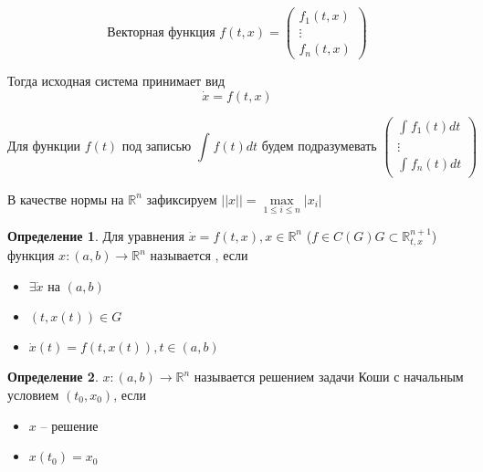 \documentclass[a4paper]{article}
\theoremstyle{indented}
\theoremstyle{definition}
\newtheorem*{defn}{Определение}
\theoremstyle{remark}
\begin{document}
\begin{equation*}
  \text{Векторная функция } f(t,x) = 
  \begin{pmatrix}
    f_1(t,x) \\
    \vdots \\
    f_n(t,x) 
  \end{pmatrix}
\end{equation*}



Тогда исходная система принимает вид
\[\dot x = f(t,x)\]

\[ \text{Для функции $f(t)$ под записью } \int_{}^{}f(t) dt \text{ будем подразумевать }
  \begin{pmatrix}
    \int_{}^{}f_1(t)dt \\
    \vdots \\
    \int_{}^{}f_n(t) dt
  \end{pmatrix}\]


В качестве нормы на $\mathbb{R}^n$ зафиксируем $||x|| = \max\limits_{1 \leqslant i \leqslant n}^{}|x_i|$

\begin{defn}
  Для уравнения $\dot x = f(t,x), x \in \mathbb{R}^n$ ($f \in C(G) G \subset \mathbb{R}^{n+1}_{t,x}$) функция $x : (a,b) \to \mathbb{R}^n$ называется , если
  \begin{itemize}
  \item $\exists \dot x $ на $(a,b)$
  \item $(t,x(t)) \in G$
  \item $\dot x(t) = f(t,x(t)), t \in (a,b)$
  \end{itemize}
\end{defn}

\begin{defn}
  $x : (a,b) \to \mathbb{R}^n $ называется решением задачи Коши с начальным условием $(t_0,x_0)$, если
  \begin{itemize}
  \item $x$ -- решение
  \item $x(t_0) = x_0$
  \end{itemize}
\end{defn}
\end{document}
